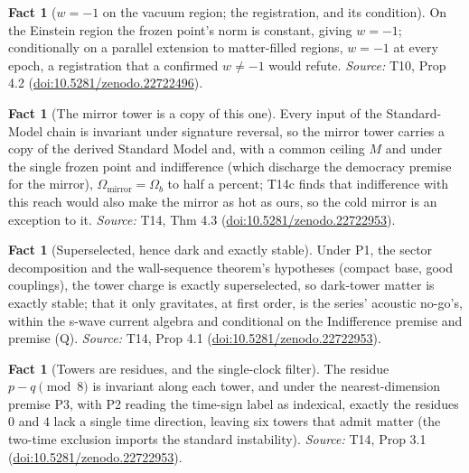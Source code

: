 \documentclass[11pt]{article}
\theoremstyle{definition}
\newtheorem{fact}[theorem]{Fact}
\theoremstyle{plain}
\begin{document}
\begin{fact}[$w = -1$ on the vacuum region; the registration, and its condition]\label{c:dark-energy.vacuum-region-registration-condition}
On the Einstein region the frozen point's norm is constant, giving $w = -1$; conditionally on a parallel extension to matter-filled regions, $w = -1$ at every epoch, a registration that a confirmed $w\neq -1$ would refute.
\emph{Source:} T10, Prop 4.2 (\href{https://doi.org/10.5281/zenodo.22722496}{doi:10.5281/zenodo.22722496}).
\end{fact}

\begin{fact}[The mirror tower is a copy of this one]\label{c:dark-matter.mirror-tower-copy-one}
Every input of the Standard-Model chain is invariant under signature reversal, so the mirror tower carries a copy of the derived Standard Model and, with a common ceiling $M$ and under the single frozen point and indifference (which discharge the democracy premise for the mirror), $\Omega_{\mathrm{mirror}} = \Omega_{b}$ to half a percent; T14c finds that indifference with this reach would also make the mirror as hot as ours, so the cold mirror is an exception to it.
\emph{Source:} T14, Thm 4.3 (\href{https://doi.org/10.5281/zenodo.22722953}{doi:10.5281/zenodo.22722953}).
\end{fact}

\begin{fact}[Superselected, hence dark and exactly stable]\label{c:dark-matter.superselected-hence-dark-exactly-stable}
Under P1, the sector decomposition and the wall-sequence theorem's hypotheses (compact base, good couplings), the tower charge is exactly superselected, so dark-tower matter is exactly stable; that it only gravitates, at first order, is the series' acoustic no-go's, within the s-wave current algebra and conditional on the Indifference premise and premise (Q).
\emph{Source:} T14, Prop 4.1 (\href{https://doi.org/10.5281/zenodo.22722953}{doi:10.5281/zenodo.22722953}).
\end{fact}

\begin{fact}[Towers are residues, and the single-clock filter]\label{c:dark-matter.towers-are-residues-single-clock-filter}
The residue $p - q \pmod 8$ is invariant along each tower, and under the nearest-dimension premise P3, with P2 reading the time-sign label as indexical, exactly the residues $0$ and $4$ lack a single time direction, leaving six towers that admit matter (the two-time exclusion imports the standard instability).
\emph{Source:} T14, Prop 3.1 (\href{https://doi.org/10.5281/zenodo.22722953}{doi:10.5281/zenodo.22722953}).
\end{fact}
\end{document}
